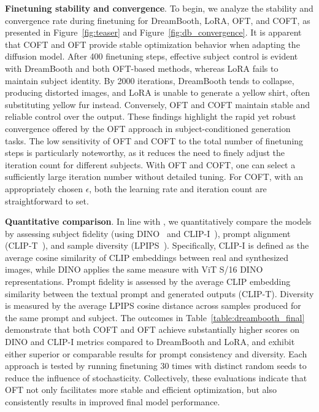 \textbf{Finetuning stability and convergence}. To begin, we analyze the stability and convergence rate during finetuning for DreamBooth, LoRA, OFT, and COFT, as presented in Figure~\ref{fig:teaser} and Figure~\ref{fig:db_convergence}. It is apparent that COFT and OFT provide stable optimization behavior when adapting the diffusion model. After 400 finetuning steps, effective subject control is evident with DreamBooth and both OFT-based methods, whereas LoRA fails to maintain subject identity. By 2000 iterations, DreamBooth tends to collapse, producing distorted images, and LoRA is unable to generate a yellow shirt, often substituting yellow fur instead. Conversely, OFT and COFT maintain stable and reliable control over the output. These findings highlight the rapid yet robust convergence offered by the OFT approach in subject-conditioned generation tasks. The low sensitivity of OFT and COFT to the total number of finetuning steps is particularly noteworthy, as it reduces the need to finely adjust the iteration count for different subjects. With OFT and COFT, one can select a sufficiently large iteration number without detailed tuning. For COFT, with an appropriately chosen $\epsilon$, both the learning rate and iteration count are straightforward to set.

\textbf{Quantitative comparison}. In line with \cite{ruiz2023dreambooth}, we quantitatively compare the models by assessing subject fidelity (using DINO~\cite{caron2021emerging} and CLIP-I~\cite{radford2021learning}), prompt alignment (CLIP-T~\cite{radford2021learning}), and sample diversity (LPIPS~\cite{zhang2018unreasonable}). Specifically, CLIP-I is defined as the average cosine similarity of CLIP embeddings between real and synthesized images, while DINO applies the same measure with ViT S/16 DINO representations. Prompt fidelity is assessed by the average CLIP embedding similarity between the textual prompt and generated outputs (CLIP-T). Diversity is measured by the average LPIPS cosine distance across samples produced for the same prompt and subject. The outcomes in Table~\ref{table:dreambooth_final} demonstrate that both COFT and OFT achieve substantially higher scores on DINO and CLIP-I metrics compared to DreamBooth and LoRA, and exhibit either superior or comparable results for prompt consistency and diversity. Each approach is tested by running finetuning 30 times with distinct random seeds to reduce the influence of stochasticity. Collectively, these evaluations indicate that OFT not only facilitates more stable and efficient optimization, but also consistently results in improved final model performance.

